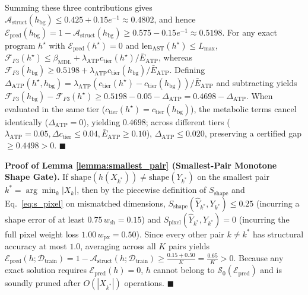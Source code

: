 \documentclass[10pt,a4paper]{article}
\begin{document}
Summing these three contributions gives $\mathcal{A}_{\text{struct}}(h_{\text{bg}}) \le 0.425 + 0.15 e^{-1} \approx 0.4802$, and hence $\mathcal{E}_{\text{pred}}(h_{\text{bg}}) = 1 - \mathcal{A}_{\text{struct}}(h_{\text{bg}}) \ge 0.575 - 0.15 e^{-1} \approx 0.5198$. For any exact program $h^\star$ with $\mathcal{E}_{\text{pred}}(h^\star) = 0$ and $\text{len}_{\text{AST}}(h^\star) \le L_{\max}$, $\mathcal{F}_{F3}(h^\star) \le \beta_{\text{MDL}} + \lambda_{\text{ATP}} c_{\text{tier}}(h^\star)/\bar{E}_{\text{ATP}}$, whereas $\mathcal{F}_{F3}(h_{\text{bg}}) \ge 0.5198 + \lambda_{\text{ATP}} c_{\text{tier}}(h_{\text{bg}})/\bar{E}_{\text{ATP}}$. Defining $\Delta_{\text{ATP}}(h^\star, h_{\text{bg}}) = \lambda_{\text{ATP}}(c_{\text{tier}}(h^\star) - c_{\text{tier}}(h_{\text{bg}}))/\bar{E}_{\text{ATP}}$ and subtracting yields $\mathcal{F}_{F3}(h_{\text{bg}}) - \mathcal{F}_{F3}(h^\star) \ge 0.5198 - 0.05 - \Delta_{\text{ATP}} = 0.4698 - \Delta_{\text{ATP}}$. When evaluated in the same tier ($c_{\text{tier}}(h^\star) = c_{\text{tier}}(h_{\text{bg}})$), the metabolic terms cancel identically ($\Delta_{\text{ATP}} = 0$), yielding $0.4698$; across different tiers ($\lambda_{\text{ATP}}=0.05, \Delta c_{\text{tier}} \le 0.04, \bar{E}_{\text{ATP}} \ge 0.10$), $\Delta_{\text{ATP}} \le 0.020$, preserving a certified gap $\ge 0.4498 > 0$. $\blacksquare$

\textbf{Proof of Lemma \ref{lemma:smallest_pair} (Smallest-Pair Monotone Shape Gate).}
If $\text{shape}(h(X_{k^*})) \neq \text{shape}(Y_{k^*})$ on the smallest pair $k^* = \arg\min_k |X_k|$, then by the piecewise definition of $S_{\text{shape}}$ and Eq.~\eqref{eq:s_pixel} on mismatched dimensions, $S_{\text{shape}}(\hat{Y}_{k^*}, Y_{k^*}) \le 0.25$ (incurring a shape error of at least $0.75\,w_{\text{sh}} = 0.15$) and $S_{\text{pixel}}(\hat{Y}_{k^*}, Y_{k^*}) = 0$ (incurring the full pixel weight loss $1.00\,w_{\text{px}} = 0.50$). Since every other pair $k \neq k^*$ has structural accuracy at most $1.0$, averaging across all $K$ pairs yields $\mathcal{E}_{\text{pred}}(h; \mathcal{D}_{\text{train}}) = 1 - \mathcal{A}_{\text{struct}}(h; \mathcal{D}_{\text{train}}) \ge \frac{0.15 + 0.50}{K} = \frac{0.65}{K} > 0$. Because any exact solution requires $\mathcal{E}_{\text{pred}}(h) = 0$, $h$ cannot belong to $\mathcal{S}_0(\mathcal{E}_{\text{pred}})$ and is soundly pruned after $O(|X_{k^*}|)$ operations. $\blacksquare$
\end{document}
